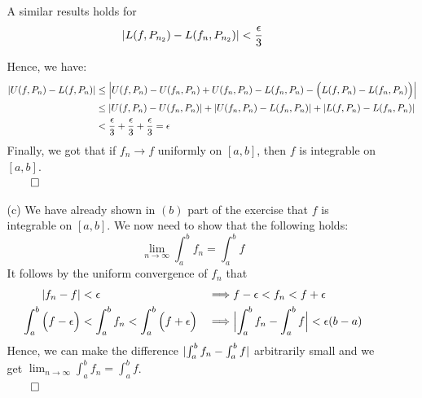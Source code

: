 \documentclass[11pt]{article}
\DeclarePairedDelimiter\abs{\lvert}{\rvert}%
\DeclarePairedDelimiter\absb{\Big\lvert}{\Big\rvert}%
\begin{document}
\begin{itemize}
\begin{itemize}
                A similar results holds for
                \begin{equation*}
                  \abs{L(f, P_{n_2}) - L(f_n, P_{n_2})}  < \frac{\epsilon}{3}
                \end{equation*}

                Hence, we have:
                \begin{align*}
                  \abs{U(f, P_n) - L(f, P_n)} &\leq 
                  \absb{U(f, P_n) - U(f_n, P_n) + U(f_n, P_n) - L(f_n, P_n) -
                      \Big(L(f, P_n) - L(f_n, P_n)\Big)}\\
                  &\leq \abs{ U(f, P_n) - U(f_n, P_n) } + \abs{ U(f_n, P_n) -
                      L(f_n, P_n) } + \abs{ L(f, P_n) - L(f_n, P_n) }\\
                  &< \frac{\epsilon}{3} + \frac{\epsilon}{3} +
                     \frac{\epsilon}{3} = \epsilon
                \end{align*}
                Finally, we got that if $f_n \to f$ uniformly on $[a, b]$, then
                $f$ is integrable on $[a, b]$.\\
                $\qed$

            \item[(c)]
                We have already shown in $(b)$ part of the exercise that $f$ is
                integrable on $[a, b]$. We now need to show that the following
                holds:
                \begin{equation*}
                  \lim_{n\to \infty} \int_a^b f_n = \int_a^b f
                \end{equation*}
                It follows by the uniform convergence of $f_n$ that
                \begin{align}
                    \abs{f_n - f} &< \epsilon &\implies& f - \epsilon < f_n <
                    f + \epsilon\\
                    \int_a^b \Big(f - \epsilon\Big) &< \int_a^b f_n < \int_a^b
                    \Big(f + \epsilon\Big) &\implies& \absb{\int_a^b f_n -
                    \int_a^b f} < \epsilon(b - a)
                \end{align}
                Hence, we can make the difference $\abs{\int_a^b f_n - \int_a^b
                f}$ arbitrarily small and we get $\lim_{n\to \infty} \int_a^b
                f_n = \int_a^b f$.\\
                $\qed$
        \end{itemize}


\end{itemize}
\end{document}
